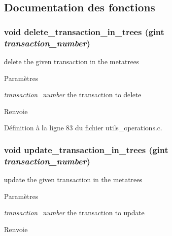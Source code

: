 \subsection{Documentation des fonctions}
\subsubsection[{delete\_\-transaction\_\-in\_\-trees}]{\setlength{\rightskip}{0pt plus 5cm}void delete\_\-transaction\_\-in\_\-trees (gint {\em transaction\_\-number})}\label{utils__operations_8c_a3e5da28eed95cd789a2b084e60463ac8}
delete the given transaction in the metatrees


\begin{DoxyParams}{Paramètres}
\item[{\em transaction\_\-number}]the transaction to delete\end{DoxyParams}
\begin{DoxyReturn}{Renvoie}

\end{DoxyReturn}


Définition à la ligne 83 du fichier utils\_\-operations.c.

\subsubsection[{update\_\-transaction\_\-in\_\-trees}]{\setlength{\rightskip}{0pt plus 5cm}void update\_\-transaction\_\-in\_\-trees (gint {\em transaction\_\-number})}\label{utils__operations_8c_a74b8b20760e6e001d3344a0c9fc2204a}
update the given transaction in the metatrees


\begin{DoxyParams}{Paramètres}
\item[{\em transaction\_\-number}]the transaction to update\end{DoxyParams}
\begin{DoxyReturn}{Renvoie}

\end{DoxyReturn}


